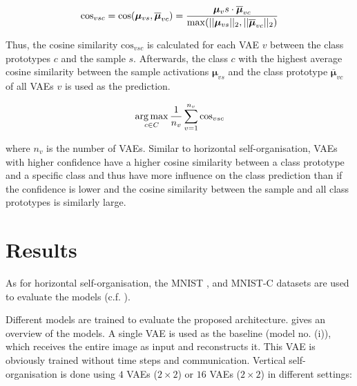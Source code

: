 \begin{align}\eqlbl{hso_13}
		\text{cos}_{vsc} = \text{cos}(\boldsymbol{\mu}_{vs}, \boldsymbol{\overline{\mu}}_{vc}) = \frac{\boldsymbol{\mu}_vs \cdot \boldsymbol{\overline{\mu}}_{vc}}{\max(||\boldsymbol{\mu}_{vs}||_2, ||\boldsymbol{\overline{\mu}}_{vc}||_2)}
\end{align}

Thus, the cosine similarity $\text{cos}_{vsc}$ is calculated for each VAE $v$ between the class prototypes $c$ and the sample $s$.
Afterwards, the class $c$ with the highest average cosine similarity between the sample activations $\boldsymbol{\mu}_{vs}$ and the class prototype $\boldsymbol{\overline{\mu}}_{vc}$ of all VAEs $v$ is used as the prediction.

\begin{align}\eqlbl{hso_14}
		\argmax_{c \in C} \frac{1}{n_v} \sum_{v=1}^{n_v} \text{cos}_{vsc}
\end{align}

where $n_v$ is the number of VAEs. Similar to horizontal self-organisation, VAEs with higher confidence have a higher cosine similarity between a class prototype and a specific class and thus have more influence on the class prediction than if the confidence is lower and the cosine similarity between the sample and all class prototypes is similarly large.



\section{Results}
As for horizontal self-organisation, the MNIST \cite{Lecun_Bottou_Bengio_Haffner_1998}, and MNIST-C \cite{Mu_Gilmer_2019} datasets are used to evaluate the models (c.f. ). 

Different models are trained to evaluate the proposed architecture.  gives an overview of the models. A single VAE is used as the baseline (model no. (i)), which receives the entire image as input and reconstructs it. This VAE is obviously trained without time steps and communication. Vertical self-organisation is done using $4$ VAEs ($2\times 2$) or $16$ VAEs ($2\times 2$) in different settings:

